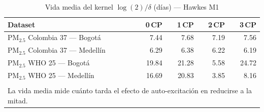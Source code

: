 \begin{table}[htbp]
\centering
\caption{Vida media del kernel $\log(2)/\delta$ (d\'{i}as) --- Hawkes M1}
\label{tab:hawkes_halflife}
\begin{tabular}{lrrrr}
\toprule
Dataset & 0\,CP & 1\,CP & 2\,CP & 3\,CP \\
\midrule
PM$_{2.5}$ Colombia 37 --- Bogot\'{a} & 7.44 & 7.68 & 7.19 & 7.56 \\
PM$_{2.5}$ Colombia 37 --- Medell\'{i}n & 6.29 & 6.38 & 6.22 & 6.19 \\
PM$_{2.5}$ WHO 25 --- Bogot\'{a} & 19.84 & 21.28 & 5.58 & 24.72 \\
PM$_{2.5}$ WHO 25 --- Medell\'{i}n & 16.69 & 20.83 & 3.85 & 8.16 \\
\bottomrule
\\[-0.5em]
\multicolumn{5}{l}{\footnotesize La vida media mide cu\'{a}nto tarda el efecto de auto-excitaci\'{o}n en reducirse a la mitad.}
\end{tabular}
\end{table}
